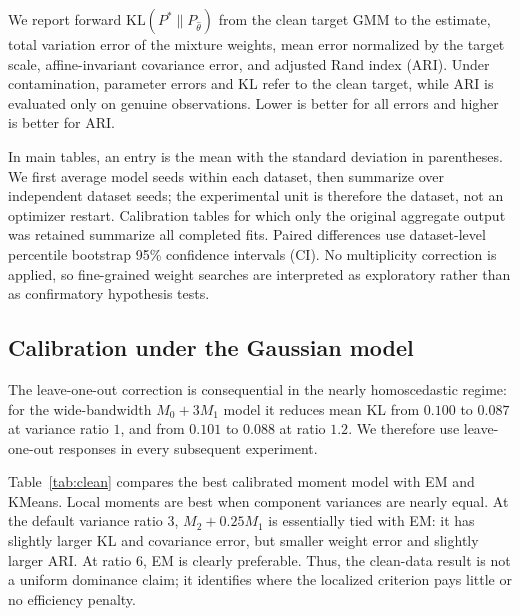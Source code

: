 \documentclass[11pt,a4paper]{article}
\newcommand{\KL}{\mathrm{KL}}
\newcommand{\Mzero}{M_0}
\newcommand{\Mone}{M_1}
\newcommand{\Mtwo}{M_2}
\begin{document}
We report forward $\KL(P^*\|P_{\hat\theta})$ from the clean target GMM to the
estimate, total variation error of the mixture weights, mean error normalized
by the target scale, affine-invariant covariance error, and adjusted Rand
index (ARI).  Under contamination, parameter errors and KL refer to the clean
target, while ARI is evaluated only on genuine observations.  Lower is better
for all errors and higher is better for ARI.

In main tables, an entry is the mean with the standard deviation in
parentheses.  We first average model seeds within each dataset, then summarize
over independent dataset seeds; the experimental unit is therefore the
dataset, not an optimizer restart.  Calibration tables for which only the
original aggregate output was retained summarize all completed fits.  Paired
differences use dataset-level percentile bootstrap 95\% confidence intervals
(CI).  No multiplicity correction is applied, so fine-grained weight searches
are interpreted as exploratory rather than as confirmatory hypothesis tests.

\subsection{Calibration under the Gaussian model}
\label{sec:clean_calibration}

The leave-one-out correction is consequential in the nearly homoscedastic
regime: for the wide-bandwidth $\Mzero+3\Mone$ model it reduces mean KL from
$0.100$ to $0.087$ at variance ratio $1$, and from $0.101$ to $0.088$ at ratio
$1.2$.  We therefore use leave-one-out responses in every subsequent
experiment.

Table~\ref{tab:clean} compares the best calibrated moment model with EM and
KMeans.  Local moments are best when component variances are nearly equal.
At the default variance ratio $3$, $\Mtwo+0.25\Mone$ is essentially tied with
EM: it has slightly larger KL and covariance error, but smaller weight error
and slightly larger ARI.  At ratio $6$, EM is clearly preferable.  Thus, the
clean-data result is not a uniform dominance claim; it identifies where the
localized criterion pays little or no efficiency penalty.
\end{document}
